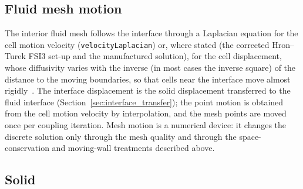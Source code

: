 \subsection{Fluid mesh motion}\label{sec:fluid_mesh_motion}

The interior fluid mesh follows the interface through a Laplacian equation for the cell motion velocity (\texttt{velocityLaplacian}) or, where stated (the corrected Hron--Turek FSI3 set-up and the manufactured solution), for the cell displacement, whose diffusivity varies with the inverse (in most cases the inverse square) of the distance to the moving boundaries, so that cells near the interface move almost rigidly~\citep{Tukovic2018}.
The interface displacement is the solid displacement transferred to the fluid interface (Section~\ref{sec:interface_transfer}); the point motion is obtained from the cell motion velocity by interpolation, and the mesh points are moved once per coupling iteration.
Mesh motion is a numerical device: it changes the discrete solution only through the mesh quality and through the space-conservation and moving-wall treatments described above.

\subsection{Solid}\label{sec:solid_solver}

